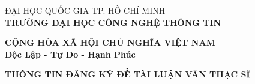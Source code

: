 \documentclass[a4paper,12pt]{article}
\begin{document}
\newpage
\thispagestyle{empty}

\vspace*{-1.5cm}


\begin{center}
    \begin{minipage}{0.46\textwidth}
        \raggedright
        \centering
        ĐẠI HỌC QUỐC GIA TP. HỒ CHÍ MINH\\
        \textbf{TRƯỜNG ĐẠI HỌC CÔNG NGHỆ THÔNG TIN}
    \end{minipage}
    \hfill
    \begin{minipage}{0.46\textwidth}
        \raggedleft
        \centering
        \textbf{CỘNG HÒA XÃ HỘI CHỦ NGHĨA VIỆT NAM}\\
        \textbf{Độc Lập - Tự Do - Hạnh Phúc}
    \end{minipage}
\end{center}


\begin{center}
    {\Large \textbf{THÔNG TIN ĐĂNG KÝ ĐỀ TÀI LUẬN VĂN THẠC SĨ}}
\end{center}
\end{document}
